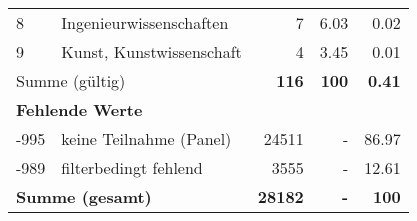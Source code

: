 \begin{longtable}{lXrrr}
     8 &
     \multicolumn{1}{X}{ Ingenieurwissenschaften   } &


       \num{7} &
       \num[round-mode=places,round-precision=2]{6.03} &
         \num[round-mode=places,round-precision=2]{0.02} \\

     9 &
     \multicolumn{1}{X}{ Kunst, Kunstwissenschaft   } &


       \num{4} &
       \num[round-mode=places,round-precision=2]{3.45} &
         \num[round-mode=places,round-precision=2]{0.01} \\
     \midrule
     \multicolumn{2}{l}{Summe (gültig)} &
       \textbf{\num{116}} &
     \textbf{100} &
       \textbf{\num[round-mode=places,round-precision=2]{0.41}} \\
     \multicolumn{5}{l}{\textbf{Fehlende Werte}}\\
       -995 &
       keine Teilnahme (Panel) &
         \num{24511} &
        - &
         \num[round-mode=places,round-precision=2]{86.97} \\
       -989 &
       filterbedingt fehlend &
         \num{3555} &
        - &
         \num[round-mode=places,round-precision=2]{12.61} \\
     \midrule
     \multicolumn{2}{l}{\textbf{Summe (gesamt)}} &
          \textbf{\num{28182}} &
        \textbf{-} &
        \textbf{100} \\
     \bottomrule
     \end{longtable}
     
